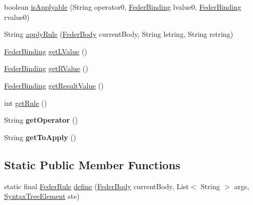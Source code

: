 \begin{DoxyCompactItemize}
\item 
boolean \hyperlink{classfeder_1_1types_1_1FederRule_a90ca7877e026698624a675f72783e7d2}{is\+Applyable} (String operator0, \hyperlink{classfeder_1_1types_1_1FederBinding}{Feder\+Binding} lvalue0, \hyperlink{classfeder_1_1types_1_1FederBinding}{Feder\+Binding} rvalue0)
\item 
String \hyperlink{classfeder_1_1types_1_1FederRule_a3df175f196c684adb0ef4fa99a2599e0}{apply\+Rule} (\hyperlink{classfeder_1_1types_1_1FederBody}{Feder\+Body} current\+Body, String lstring, String rstring)
\item 
\hyperlink{classfeder_1_1types_1_1FederBinding}{Feder\+Binding} \hyperlink{classfeder_1_1types_1_1FederRule_a6de23e91ac085ac4fb0de47389d554bf}{get\+L\+Value} ()
\item 
\hyperlink{classfeder_1_1types_1_1FederBinding}{Feder\+Binding} \hyperlink{classfeder_1_1types_1_1FederRule_a306bb79d403d4de804ece5ae47c0d524}{get\+R\+Value} ()
\item 
\hyperlink{classfeder_1_1types_1_1FederBinding}{Feder\+Binding} \hyperlink{classfeder_1_1types_1_1FederRule_a48e0b9aca68eff113f51c03a3198ff70}{get\+Result\+Value} ()
\item 
int \hyperlink{classfeder_1_1types_1_1FederRule_a2463391941d5dc6afefa1e672fc1c62d}{get\+Rule} ()
\item 
\mbox{\label{classfeder_1_1types_1_1FederRule_af9083a73f755838ce38360b15fb3433a}} 
String {\bfseries get\+Operator} ()
\item 
\mbox{\label{classfeder_1_1types_1_1FederRule_a379510a2a05eab4ed04c37d09c6ded0e}} 
String {\bfseries get\+To\+Apply} ()
\end{DoxyCompactItemize}
\subsection*{Static Public Member Functions}
\begin{DoxyCompactItemize}
\item 
static final \hyperlink{classfeder_1_1types_1_1FederRule}{Feder\+Rule} \hyperlink{classfeder_1_1types_1_1FederRule_af2842318a6287f4096af22d056feda29}{define} (\hyperlink{classfeder_1_1types_1_1FederBody}{Feder\+Body} current\+Body, List$<$ String $>$ args, \hyperlink{classfeder_1_1SyntaxTreeElement}{Syntax\+Tree\+Element} ste)
\end{DoxyCompactItemize}
